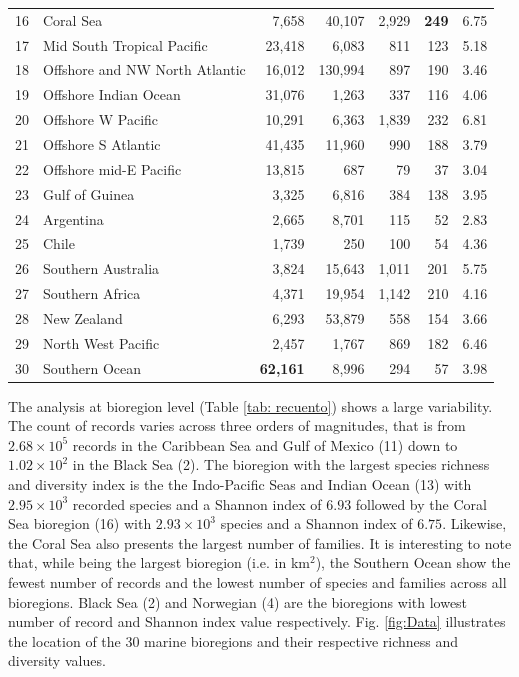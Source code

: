 \documentclass[12pt,authoryear]{elsarticle}
\begin{document}
\begin{table}[]
{\begin{tabular}{ c | l  r  r  r  r  r }
  16 & Coral Sea                           &   7,658 &  40,107 & 2,929 & \textbf{249} & 6.75\\ 
  17 & Mid South Tropical Pacific          &  23,418 &   6,083 &   811 & 123 & 5.18 \\ 
  18 & Offshore and NW North Atlantic      &  16,012 & 130,994 &   897 & 190 & 3.46 \\ 
  19 & Offshore Indian Ocean               &  31,076 &   1,263 &   337 & 116 & 4.06 \\ 
  20 & Offshore W Pacific                  &  10,291 &   6,363 & 1,839 & 232 & 6.81 \\ 
  21 & Offshore S Atlantic                 &  41,435 &  11,960 &   990 & 188 & 3.79 \\ 
  22 & Offshore mid-E Pacific              &  13,815 &     687 &    79 & 37  & 3.04 \\ 
  23 & Gulf of Guinea                      &   3,325 &   6,816 &   384 & 138 & 3.95 \\ 
  24 & Argentina                           &   2,665 &   8,701 &   115 & 52  & 2.83 \\ 
  25 & Chile                               &   1,739 &     250 &   100 & 54  & 4.36 \\ 
  26 & Southern Australia                  &   3,824 &  15,643 & 1,011 & 201 & 5.75 \\ 
  27 & Southern Africa                     &   4,371 &  19,954 & 1,142 & 210 & 4.16 \\ 
  28 & New Zealand                         &   6,293 &  53,879 &   558 & 154 & 3.66 \\ 
  29 & North West Pacific                  &   2,457 &   1,767 &   869 & 182 & 6.46 \\ 
  30 & Southern Ocean                      &  \textbf{62,161} & 8,996 & 294 & 57 & 3.98 \\
\hline
\hline

\end{tabular}
}
\end{table}

The analysis at bioregion level (Table \ref{tab: recuento}) shows a large variability. The count of records varies across three orders of magnitudes, that is from $2.68\times 10^5$ records in the Caribbean Sea and Gulf of Mexico (11) down to $1.02 \times 10^2$ in the Black Sea (2). The bioregion with the largest species richness and diversity index is the the Indo-Pacific Seas and Indian Ocean (13) with $2.95 \times 10^3$ recorded species and a Shannon index of $6.93$ followed by the Coral Sea bioregion (16) with $2.93 \times 10^3$ species and a Shannon index of $6.75$. Likewise, the Coral Sea also presents the largest number of families. It is interesting to note that, while being the largest bioregion (i.e. in km$^2$), the Southern Ocean show the fewest number of records and the lowest number of species and families across all bioregions. Black Sea (2) and Norwegian (4) are the bioregions with lowest number of record and Shannon index value respectively. Fig. \ref{fig:Data} illustrates the location of the 30 marine bioregions and their respective richness and diversity values.
\end{document}
